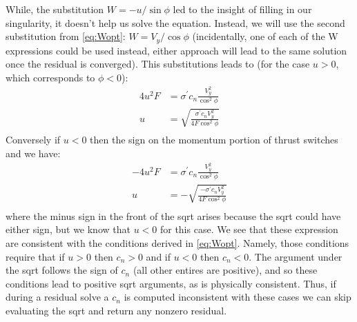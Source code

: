 While, the substitution $W = -u/\sin\phi$ led to the insight of filling in our singularity, it doesn't help us solve the equation.  Instead, we will use the second substitution from \cref{eq:Wopt}: $W = V_y / \cos\phi$ (incidentally, one of each of the W expressions could be used instead, either approach will lead to the same solution once the residual is converged).  This substitutions leads to (for the case $u > 0$, which corresponds to $\phi < 0$):
\begin{equation}
\begin{aligned}
4 u^2 F&= \sigma^\prime c_n \frac{V_y^2}{\cos^2\phi}\\
u&= \sqrt{\frac{\sigma^\prime c_n V_y^2}{4 F \cos^2\phi}}\\
\end{aligned}
\end{equation}
Conversely if $u < 0$ then the sign on the momentum portion of thrust switches and we have:
\begin{equation}
\begin{aligned}
- 4 u^2 F&= \sigma^\prime c_n \frac{V_y^2}{\cos^2\phi}\\
u&= -\sqrt{\frac{-\sigma^\prime c_n V_y^2}{4 F \cos^2\phi}}\\
\end{aligned}
\end{equation}
where the minus sign in the front of the sqrt arises because the sqrt could have either sign, but we know that $u < 0$ for this case.  We see that these expression are consistent with the conditions derived in \cref{eq:Wopt}.  Namely, those conditions require that if $u > 0$ then $c_n > 0$ and if $u < 0$ then $c_n < 0$.  The argument under the sqrt follows the sign of $c_n$ (all other entires are positive), and so these conditions lead to positive sqrt arguments, as is physically consistent.  Thus, if during a residual solve a $c_n$ is computed inconsistent with these cases we can skip evaluating the sqrt and return any nonzero residual.


